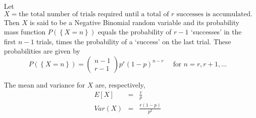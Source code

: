 \documentclass[smaller, handout]{beamer}\usepackage[]{graphicx}\usepackage[]{color}
\renewcommand{\Pr}{P}
\begin{document}
\begin{frame}{\secname}%


\begin{definition}
Let
$$X= \text{the total number of trials required until a total of $r$ successes is accumulated}.$$
Then $X$ is said to be a Negative Binomial random variable and its probability mass function
$\Pr (\left\{ X=n\right\})$ equals the probability of $r-1$ `successes' in the first $n-1$ trials, times the probability of a `success' on
the last trial. These probabilities are given by%
\begin{equation*}
\Pr (\left\{ X=n\right\}) =\left(
\begin{array}{c}
n-1 \\
r-1%
\end{array}%
\right) p^{r}\left( 1-p\right) ^{n-r}\quad \text{ for }n=r,r+1,...
\end{equation*}
\end{definition}

The mean and variance for $X$ are, respectively,%
\begin{eqnarray*}
E\left[ X\right] &=&\frac{r}{p} \\
Var\left( X\right) &=&\frac{r\left( 1-p\right) }{p^{2}}
\end{eqnarray*}

\end{frame}%
\end{document}
